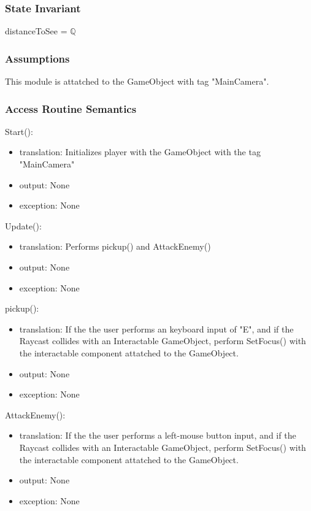\documentclass[12pt]{article}
\begin{document}
\subsubsection* {State Invariant}

distanceToSee = $\mathbb{Q}$

\subsubsection* {Assumptions}

This module is attatched to the GameObject with tag "MainCamera". 

\subsubsection* {Access Routine Semantics}

\noindent Start():
\begin{itemize}
\item translation: Initializes player with the GameObject with the tag "MainCamera"
\item output: None
\item exception: None
\end{itemize}

\noindent Update():
\begin{itemize}
\item translation: Performs pickup() and AttackEnemy()
\item output: None
\item exception: None
\end{itemize}

\noindent pickup():
\begin{itemize}
\item translation: If the the user performs an keyboard input of "E", and if the Raycast collides with an Interactable GameObject, perform SetFocus() with the interactable component attatched to the GameObject.
\item output: None
\item exception: None
\end{itemize}

\noindent AttackEnemy():
\begin{itemize}
\item translation: If the the user performs a left-mouse button input, and if the Raycast collides with an Interactable GameObject, perform SetFocus() with the interactable component attatched to the GameObject.
\item output: None
\item exception: None
\end{itemize}
\end{document}
